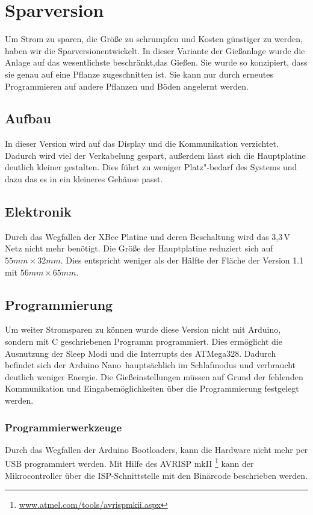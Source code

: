 
\section{Sparversion}
	Um Strom zu sparen, die Größe zu schrumpfen und Kosten günstiger zu werden, haben wir die \glqq Sparversion\grqq entwickelt.
	In dieser Variante der Gießanlage wurde die Anlage auf das wesentlichste beschränkt,das Gießen.
	Sie wurde so konzipiert, dass sie genau auf eine Pflanze zugeschnitten ist.
	Sie kann nur durch erneutes Programmieren auf andere Pflanzen und Böden angelernt werden. 	
	\subsection{Aufbau}
	In dieser Version wird auf das Display und die Kommunikation verzichtet.
	Dadurch wird viel der Verkabelung gespart, außerdem lässt sich die Hauptplatine deutlich kleiner gestalten.
	Dies führt zu weniger Platz"-bedarf des Systems und dazu das es in ein kleineres Gehäuse passt.
	\subsection{Elektronik}
	Durch das Wegfallen der XBee Platine und deren Beschaltung wird das 3,3\,V Netz nicht mehr benötigt.
	Die Größe der Hauptplatine  reduziert sich auf \begin{math} 55 mm \times 32 mm \end{math}.
	Dies entspricht weniger als der Hälfte der Fläche der Version 1.1 mit \begin{math} 56 mm \times 65 mm \end{math}.
	\subsection{Programmierung}
	Um weiter Stromsparen zu können wurde diese Version nicht mit Arduino, sondern mit C geschriebenen Programm programmiert.
	Dies ermöglicht die Ausnutzung der Sleep Modi und die Interrupts des ATMega328. 
	Dadurch befindet sich der \glqq Arduino Nano\grqq \ hauptsächlich im Schlafmodus und verbraucht deutlich weniger Energie.
	Die Gießeinstellungen müssen auf Grund der fehlenden Kommunikation und Eingabemöglichkeiten über die Programmierung festgelegt werden.
	\subsubsection{Programmierwerkzeuge}
	Durch das Wegfallen der Arduino Bootloaders, kann die Hardware nicht mehr per USB programmiert werden. 
	Mit Hilfe des AVRISP mkII \footnote{\href{http://www.atmel.com/tools/avrispmkii.aspx}{www.atmel.com/tools/avrispmkii.aspx}} kann der Mikrocontroller über die ISP-Schnittstelle mit den Binärcode beschrieben werden. 

